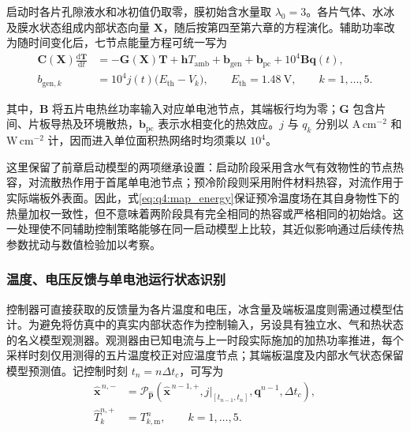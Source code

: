 启动时各片孔隙液水和冰初值仍取零，膜初始含水量取 $\lambda_0=3$。各片气体、水冰及膜水状态组成内部状态向量 $\boldsymbol X$，随后按第四至第六章的方程演化。辅助功率改为随时间变化后，七节点能量方程可统一写为
\begin{equation}
\begin{aligned}
\boldsymbol C(\boldsymbol X)\frac{\mathrm d\boldsymbol T}{\mathrm dt}
&=-\boldsymbol G(\boldsymbol X)\boldsymbol T
+\boldsymbol hT_{\mathrm{amb}}+\boldsymbol b_{\mathrm{gen}}
+\boldsymbol b_{\mathrm{pc}}+10^4\boldsymbol B\boldsymbol q(t),\\
b_{\mathrm{gen},k}&=10^4j(t)\big(E_{\mathrm{th}}-V_k\big),\qquad
E_{\mathrm{th}}=1.48\ \mathrm V,\qquad k=1,\ldots,5.
\end{aligned}
\tag{7-10}\label{eq:q4:plant_heat}
\end{equation}

其中，$\boldsymbol B$ 将五片电热丝功率输入对应单电池节点，其端板行均为零；$\boldsymbol G$ 包含片间、片板导热及环境散热，$\boldsymbol b_{\mathrm{pc}}$ 表示水相变化的热效应。$j$ 与 $q_k$ 分别以 $\mathrm{A\,cm^{-2}}$ 和 $\mathrm{W\,cm^{-2}}$ 计，因而进入单位面积热网络时均须乘以 $10^4$。

这里保留了前章启动模型的两项继承设置：启动阶段采用含水气有效物性的节点热容，对流散热作用于首尾单电池节点；预冷阶段则采用附件材料热容，对流作用于实际端板外表面。因此，式\eqref{eq:q4:map_energy}保证预冷温度场在其自身物性下的热量加权一致性，但不意味着两阶段具有完全相同的热容或严格相同的初始焓。这一处理使不同辅助控制策略能够在同一启动模型上比较，其近似影响通过后续传热参数扰动与数值检验加以考察。

\subsubsection{温度、电压反馈与单电池运行状态识别}

控制器可直接获取的反馈量为各片温度和电压，冰含量及端板温度则需通过模型估计。为避免将仿真中的真实内部状态作为控制输入，另设具有独立水、气和热状态的名义模型观测器。观测器由已知电流与上一时段实际施加的加热功率推进，每个采样时刻仅用测得的五片温度校正对应温度节点；其端板温度及内部水气状态保留模型预测值。记控制时刻 $t_n=n\Delta t_c$，可写为
\begin{equation}
\begin{aligned}
\widehat{\boldsymbol x}^{\,n,-}
&=\mathcal P_{\widehat{\boldsymbol p}}\!\left(
\widehat{\boldsymbol x}^{\,n-1,+},j|_{[t_{n-1},t_n]},\boldsymbol q^{n-1},\Delta t_c\right),
\\
\widehat T_k^{n,+}&=T_{k,\mathrm m}^n,\qquad k=1,\ldots,5.
\end{aligned}
\tag{7-11}\label{eq:q4:independent_observer}
\end{equation}

